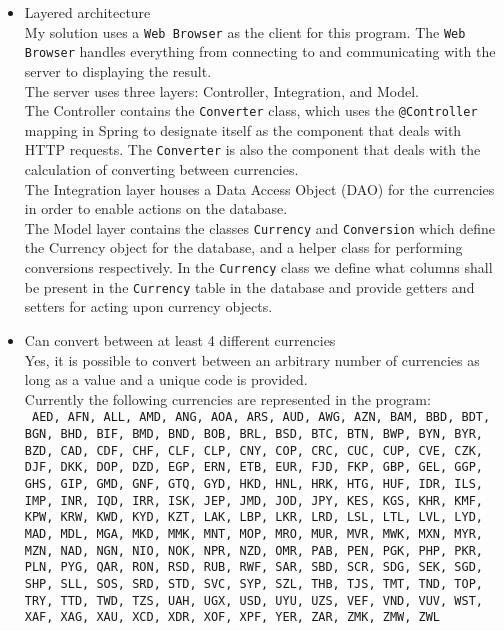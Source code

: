 \documentclass[a4paper]{scrartcl}
\begin{document}
\begin{itemize}
	\item{
		Layered architecture\\
		My solution uses a \texttt{Web Browser} as the client for this program. The \texttt{Web Browser} handles everything from connecting to and communicating with the server to displaying the result.\\
		The server uses three layers: Controller, Integration, and Model.\\
		The Controller contains the \texttt{Converter} class, which uses the \texttt{@Controller} mapping in Spring to designate itself as the component that deals with HTTP requests. The \texttt{Converter} is also the component that deals with the calculation of converting between currencies.\\
		The Integration layer houses a Data Access Object (DAO) for the currencies in order to enable actions on the database.\\
		The Model layer contains the classes \texttt{Currency} and \texttt{Conversion} which define the Currency object for the database, and a helper class for performing conversions respectively. In the \texttt{Currency} class we define what columns shall be present in the \texttt{Currency} table in the database and provide getters and setters for acting upon currency objects.
	}
	\item{
		Can convert between at least 4 different currencies\\
		Yes, it is possible to convert between an arbitrary number of currencies as long as a value and a unique code is provided.\\
		Currently the following currencies are represented in the program:\\
		\texttt{
			AED, AFN, ALL, AMD, ANG, AOA, ARS, AUD, AWG, AZN, BAM, BBD, BDT, BGN, BHD, BIF, BMD, BND, BOB, BRL, BSD, BTC, BTN, BWP, BYN, BYR, BZD, CAD, CDF, CHF, CLF, CLP, CNY, COP, CRC, CUC, CUP, CVE, CZK, DJF, DKK, DOP, DZD, EGP, ERN, ETB, EUR, FJD, FKP, GBP, GEL, GGP, GHS, GIP, GMD, GNF, GTQ, GYD, HKD, HNL, HRK, HTG, HUF, IDR, ILS, IMP, INR, IQD, IRR, ISK, JEP, JMD, JOD, JPY, KES, KGS, KHR, KMF, KPW, KRW, KWD, KYD, KZT, LAK, LBP, LKR, LRD, LSL, LTL, LVL, LYD, MAD, MDL, MGA, MKD, MMK, MNT, MOP, MRO, MUR, MVR, MWK, MXN, MYR, MZN, NAD, NGN, NIO, NOK, NPR, NZD, OMR, PAB, PEN, PGK, PHP, PKR, PLN, PYG, QAR, RON, RSD, RUB, RWF, SAR, SBD, SCR, SDG, SEK, SGD, SHP, SLL, SOS, SRD, STD, SVC, SYP, SZL, THB, TJS, TMT, TND, TOP, TRY, TTD, TWD, TZS, UAH, UGX, USD, UYU, UZS, VEF, VND, VUV, WST, XAF, XAG, XAU, XCD, XDR, XOF, XPF, YER, ZAR, ZMK, ZMW, ZWL
}}
\end{itemize}
\end{document}
